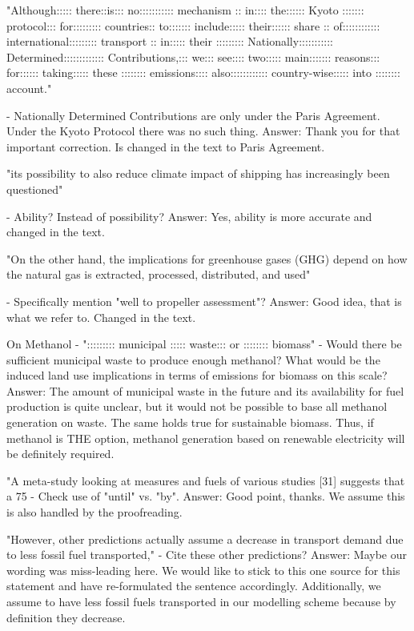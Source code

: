 "Although::::: there::is::: no::::::::::: mechanism :: in:::: the:::::: Kyoto ::::::: protocol::: for::::::::: countries:: to::::::: include::::: their:::::: share :: of:::::::::::: international::::::::: transport :: in::::: their ::::::::: Nationally::::::::::: Determined::::::::::::: Contributions,::: we::: see:::: two::::: main::::::: reasons::: for:::::: taking::::: these :::::::: emissions:::: also:::::::::::: country-wise::::: into :::::::: account."

-	Nationally Determined Contributions are only under the Paris Agreement. Under the Kyoto Protocol there was no such thing.
Answer: Thank you for that important correction. Is changed in the text to Paris Agreement.

"its possibility to also reduce climate impact of shipping has increasingly been questioned"

-	Ability? Instead of possibility?
Answer: Yes, ability is more accurate and changed in the text.

"On the other hand, the implications for greenhouse gases (GHG) depend on how the natural gas is extracted, processed, distributed, and used"

-	Specifically mention "well to propeller assessment"?
Answer: Good idea, that is what we refer to. Changed in the text.

On Methanol - "::::::::: municipal ::::: waste::: or :::::::: biomass"
-	Would there be sufficient municipal waste to produce enough methanol? What would be the induced land use implications in terms of emissions for biomass on this scale?
Answer: The amount of municipal waste in the future and its availability for fuel production is quite unclear, but it would not be possible to base all methanol generation on waste. The same holds true for sustainable biomass. Thus, if methanol is THE option, methanol generation based on renewable electricity will be definitely required.


"A meta-study looking at measures and fuels of various studies [31] suggests that a 75%
-	Check use of "until" vs. "by".
Answer: Good point, thanks. We assume this is also handled by the proofreading.

"However, other predictions actually assume a decrease in transport demand due to less fossil fuel transported,"
-	Cite these other predictions?
Answer: Maybe our wording was miss-leading here. We would like to stick to this one source for this statement and have re-formulated the sentence accordingly. Additionally, we assume to have less fossil fuels transported in our modelling scheme because by definition they decrease.


